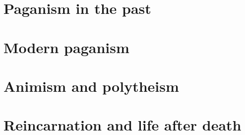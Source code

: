 \section{Paganism in the past}




\section{Modern paganism}





\section{Animism and polytheism}




\section{Reincarnation and life after death}



